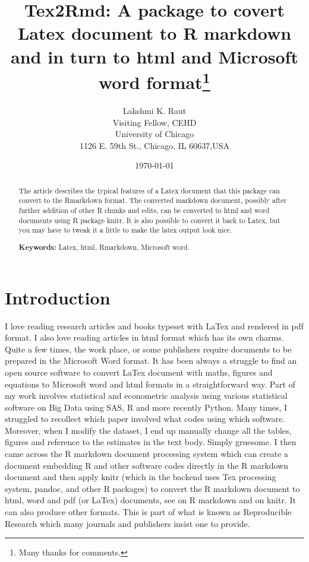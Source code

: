 \documentclass[12pt,svgnames]{article}
\begin{document}
\title{Tex2Rmd: A package to covert Latex document to R markdown and in turn to html and Microsoft word format\thanks{%
Many thanks for comments.
}}
\author{Lakshmi K. Raut \\
Visiting Fellow, CEHD\\
University of Chicago\\
1126 E. 59th St., Chicago, IL 60637,USA
}
\date{\today}
\maketitle 
\begin{abstract}
The article describes the typical features of a Latex document that this package can convert to the Rmarkdown format. The converted markdown document, possibly after further addition of other R chunks and edits, can be converted to html and word documents using R package knitr. It is also possible to convert it back to Latex, but you may have to tweak it a little to make the latex output look nice. 

\textbf{Keywords:} Latex, html, Rmarkdown, Microsoft word. 
\end{abstract}

\section{Introduction}\label{sec1}
I love reading research articles and books typeset with LaTex and rendered in pdf format. I also love reading articles in html format which has its own charms.   Quite a few times, the work place, or some publishers require documents to be prepared in the Microsoft Word format.  It has been always a struggle to find an open source software to convert LaTex document with maths, figures and equations to Microsoft word and html formats in a straightforward way. Part of my work involves statistical and econometric analysis using various statistical software on Big Data using SAS, R and more recently Python.  Many times, I struggled to recollect which paper involved what codes using which software.  Moreover, when I modify the dataset, I end up manually change all the tables, figures and reference to the estimates in the text body. Simply gruesome.  I then came across the R markdown document processing system which can create a document embedding R and other software codes directly in the R markdown document and then apply knitr (which in the backend uses Tex processing system, pandoc, and other R packages) to convert the R markdown document to html, word and pdf (or LaTex) documents, see \cite{Allaire.etal_2020,Xie.Riederer_2020} on R markdown and \cite{Xie_2015} on knitr.  It can also produce other formats. This is part of what is known as Reproducible Research which many journals and publishers insist one to provide. 
\end{document}
